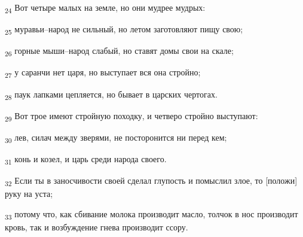 \begin{tcolorbox}
\textsubscript{24} Вот четыре малых на земле, но они мудрее мудрых:
\end{tcolorbox}
\begin{tcolorbox}
\textsubscript{25} муравьи--народ не сильный, но летом заготовляют пищу свою;
\end{tcolorbox}
\begin{tcolorbox}
\textsubscript{26} горные мыши--народ слабый, но ставят домы свои на скале;
\end{tcolorbox}
\begin{tcolorbox}
\textsubscript{27} у саранчи нет царя, но выступает вся она стройно;
\end{tcolorbox}
\begin{tcolorbox}
\textsubscript{28} паук лапками цепляется, но бывает в царских чертогах.
\end{tcolorbox}
\begin{tcolorbox}
\textsubscript{29} Вот трое имеют стройную походку, и четверо стройно выступают:
\end{tcolorbox}
\begin{tcolorbox}
\textsubscript{30} лев, силач между зверями, не посторонится ни перед кем;
\end{tcolorbox}
\begin{tcolorbox}
\textsubscript{31} конь и козел, и царь среди народа своего.
\end{tcolorbox}
\begin{tcolorbox}
\textsubscript{32} Если ты в заносчивости своей сделал глупость и помыслил злое, то [положи] руку на уста;
\end{tcolorbox}
\begin{tcolorbox}
\textsubscript{33} потому что, как сбивание молока производит масло, толчок в нос производит кровь, так и возбуждение гнева производит ссору.
\end{tcolorbox}
